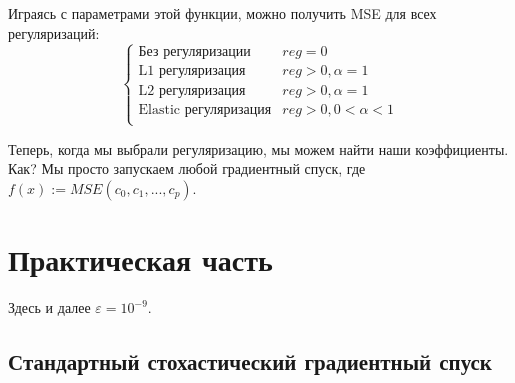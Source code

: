 \documentclass[a4paper,14pt,oneside,openany]{memoir}
\begin{document}
Играясь с параметрами этой функции, можно получить MSE для всех регуляризаций: $$\begin{cases}
	\text{Без регуляризации} & reg=0 \\
	\text{L1 регуляризация} & reg>0, \alpha=1 \\
	\text{L2 регуляризация} & reg>0, \alpha=1 \\
	\text{Elastic регуляризация} & reg>0, 0 < \alpha < 1 \\
\end{cases}$$

Теперь, когда мы выбрали регуляризацию, мы можем найти наши коэффициенты. Как? Мы просто запускаем любой градиентный спуск, где $f(x):=MSE(c_0, c_1, ..., c_p)$.

\chapter{Практическая часть}

Здесь и далее $\varepsilon = 10^{-9}$.
 
\section{Стандартный стохастический градиентный спуск}
\end{document}
